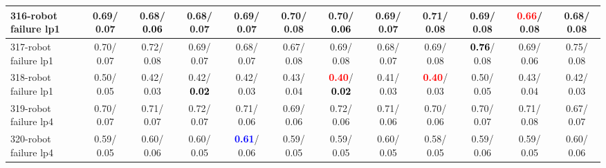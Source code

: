 \begin{table}[h]
\begin{center}
{\begin{tabular}{lc|c|c|c|c|c|c|c|c|c|c}
316-robot failure lp1 &   0.69/  0.07 &   0.68/\textcolor{black}{\textbf{  0.06}} &   0.68/  0.07 &   0.69/  0.07 &   0.70/  0.08 &   0.70/\textcolor{black}{\textbf{  0.06}} &   0.69/  0.07 &   0.71/  0.08 &   0.69/  0.08 & \textcolor{red}{\textbf{  0.66}}/  0.08 &   0.68/  0.08 \\ \hline
317-robot failure lp1 &   0.70/  0.07 &   0.72/  0.08 &   0.69/  0.07 &   0.68/  0.07 &   0.67/  0.08 &   0.69/  0.08 &   0.68/  0.07 &   0.69/  0.08 & \textcolor{black}{\textbf{  0.76}}/  0.08 &   0.69/  0.06 &   0.75/  0.08 \\
318-robot failure lp1 &   0.50/  0.05 &   0.42/  0.03 &   0.42/\textcolor{black}{\textbf{  0.02}} &   0.42/  0.03 &   0.43/  0.04 & \textcolor{red}{\textbf{  0.40}}/\textcolor{black}{\textbf{  0.02}} &   0.41/  0.03 & \textcolor{red}{\textbf{  0.40}}/  0.03 &   0.50/  0.05 &   0.43/  0.04 &   0.42/  0.03 \\
319-robot failure lp4 &   0.70/  0.07 &   0.71/  0.07 &   0.72/  0.07 &   0.71/  0.06 &   0.69/  0.06 &   0.72/  0.06 &   0.71/  0.06 &   0.70/  0.06 &   0.70/  0.07 &   0.71/  0.08 &   0.67/  0.07 \\
320-robot failure lp4 &   0.59/  0.05 &   0.60/  0.06 &   0.60/  0.05 & \textcolor{blue}{\textbf{  0.61}}/  0.06 &   0.59/  0.05 &   0.59/  0.05 &   0.60/  0.05 &   0.58/  0.05 &   0.59/  0.06 &   0.59/  0.05 &   0.60/  0.06 \\\end{tabular}}\label{stratsALCKappa9Allalla}
\end{center}
\end{table}
